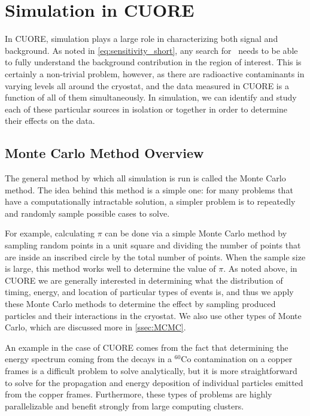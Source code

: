 \chapter{Simulation in CUORE}

In CUORE, simulation plays a large role in characterizing both signal and background.
As noted in \autoref{eq:sensitivity_short}, any search for \zeronubb~needs to be able to fully understand the background contribution in the region of interest.
This is certainly a non-trivial problem, however, as there are radioactive contaminants in varying levels all around the cryostat, and the data measured in CUORE is a function of all of them simultaneously.
In simulation, we can identify and study each of these particular sources in isolation or together in order to determine their effects on the data.
\section{Monte Carlo Method Overview}
The general method by which all simulation is run is called the Monte Carlo method.
The idea behind this method is a simple one: for many problems that have a computationally intractable solution, a simpler problem is to repeatedly and randomly sample possible cases to solve.

For example, calculating $\pi$ can be done via a simple Monte Carlo method by sampling random points in a unit square and dividing the number of points that are inside an inscribed circle by the total number of points.
When the sample size is large, this method works well to determine the value of $\pi$.
As noted above, in CUORE we are generally interested in determining what the distribution of timing, energy, and location of particular types of events is, and thus we apply these Monte Carlo methods to determine the effect by sampling produced particles and their interactions in the cryostat.
We also use other types of Monte Carlo, which are discussed more in \autoref{ssec:MCMC}.

An example in the case of CUORE comes from the fact that determining the energy spectrum coming from the decays in a $^{60}\textrm{Co}$ contamination on a copper frames is a difficult problem to solve analytically, but it is more straightforward to solve for the propagation and energy deposition of individual particles emitted from the copper frames.
Furthermore, these types of problems are highly parallelizable and benefit strongly from large computing clusters.

